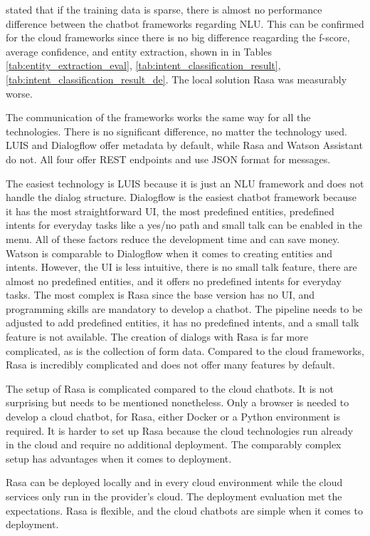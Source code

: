 \citet{braunEvaluatingNLU} stated that if the training data is sparse, there is almost no performance difference between the chatbot frameworks regarding NLU.
This can be confirmed for the cloud frameworks since there is no big difference reagarding the f-score, average confidence, and entity extraction, shown in in Tables \ref{tab:entity_extraction_eval}, \ref{tab:intent_classification_result}, \ref{tab:intent_classification_result_de}.
The local solution Rasa was measurably worse.

The communication of the frameworks works the same way for all the technologies.
There is no significant difference, no matter the technology used.
LUIS and Dialogflow offer metadata by default, while Rasa and Watson Assistant do not.
All four offer REST endpoints and use JSON format for messages.

The easiest technology is LUIS because it is just an NLU framework and does not handle the dialog structure.
Dialogflow is the easiest chatbot framework because it has the most straightforward UI, the most predefined entities,
predefined intents for everyday tasks like a yes/no path and small talk can be enabled in the menu.
All of these factors reduce the development time and can save money.
Watson is comparable to Dialogflow when it comes to creating entities and intents. However, the UI is less intuitive, there is no small talk feature, there are almost no predefined entities, and it offers no predefined intents for everyday tasks.
The most complex is Rasa since the base version has no UI, and programming skills are mandatory to develop a chatbot.
The pipeline needs to be adjusted to add predefined entities, it has no predefined intents, and a small talk feature is not available.
The creation of dialogs with Rasa is far more complicated, as is the collection of form data.
Compared to the cloud frameworks, Rasa is incredibly complicated and does not offer many features by default.

The setup of Rasa is complicated compared to the cloud chatbots.
It is not surprising but needs to be mentioned nonetheless.
Only a browser is needed to develop a cloud chatbot, for Rasa, either Docker or a Python environment is required.
It is harder to set up Rasa because the cloud technologies run already in the cloud and require no additional deployment.
The comparably complex setup has advantages when it comes to deployment.

Rasa can be deployed locally and in every cloud environment while the cloud services only run in the provider's cloud.
The deployment evaluation met the expectations.
Rasa is flexible, and the cloud chatbots are simple when it comes to deployment.

